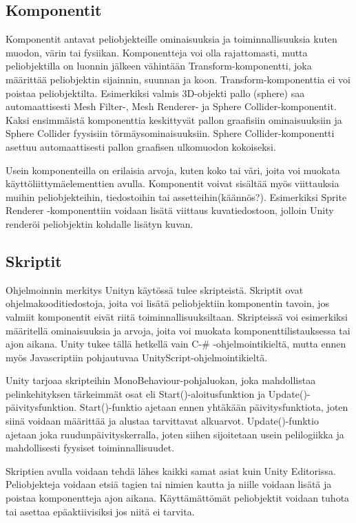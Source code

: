 \documentclass[utf8]{gradu3}
\begin{document}
\subsection{Komponentit}

Komponentit antavat peliobjekteille ominaisuuksia ja toiminnallisuuksia kuten muodon, värin tai fysiikan. Komponentteja voi olla rajattomasti, mutta peliobjektilla on luonnin jälkeen vähintään Transform-komponentti, joka määrittää peliobjektin sijainnin, suunnan ja koon. Transform-komponenttia ei voi poistaa peliobjektilta. Esimerkiksi valmis 3D-objekti pallo (sphere) saa automaattisesti Mesh Filter-, Mesh Renderer- ja Sphere Collider-komponentit. Kaksi ensimmäistä komponenttia keskittyvät pallon graafisiin ominaisuuksiin ja Sphere Collider fyysisiin törmäysominaisuuksiin. Sphere Collider-komponentti asettuu automaattisesti pallon graafisen ulkomuodon kokoiseksi.

Usein komponenteilla on erilaisia arvoja, kuten koko tai väri, joita voi muokata käyttöliittymäelementtien avulla. Komponentit voivat sisältää myös viittauksia muihin peliobjekteihin, tiedostoihin tai assetteihin(käännös?). Esimerkiksi Sprite Renderer -komponenttiin voidaan lisätä viittaus kuvatiedostoon, jolloin Unity renderöi peliobjektin kohdalle lisätyn kuvan.

\subsection{Skriptit}

Ohjelmoinnin merkitys Unityn käytössä tulee skripteistä. Skriptit ovat ohjelmakooditiedostoja, joita voi lisätä peliobjektiin komponentin tavoin, jos valmiit komponentit eivät riitä toiminnallisuuksiltaan. Skripteissä voi esimerkiksi määritellä ominaisuuksia ja arvoja, joita voi muokata komponenttilistauksessa tai ajon aikana. Unity tukee tällä hetkellä vain C-\# -ohjelmointikieltä, mutta ennen myös Javascriptiin pohjautuvaa UnityScript-ohjelmointikieltä.

Unity tarjoaa skripteihin MonoBehaviour-pohjaluokan, joka mahdollistaa pelinkehityksen tärkeimmät osat eli Start()-aloitusfunktion ja Update()-päivitysfunktion. Start()-funktio ajetaan ennen yhtäkään päivitysfunktiota, joten siinä voidaan määrittää ja alustaa tarvittavat alkuarvot. Update()-funktio ajetaan joka ruudunpäivityskerralla, joten siihen sijoitetaan usein pelilogiikka ja mahdollisesti fyysiset toiminnallisuudet.

Skriptien avulla voidaan tehdä lähes kaikki samat asiat kuin Unity Editorissa. Peliobjekteja voidaan etsiä tagien tai nimien kautta ja niille voidaan lisätä ja poistaa komponentteja ajon aikana. Käyttämättömät peliobjektit voidaan tuhota tai asettaa epäaktiivisiksi jos niitä ei tarvita.
\end{document}
